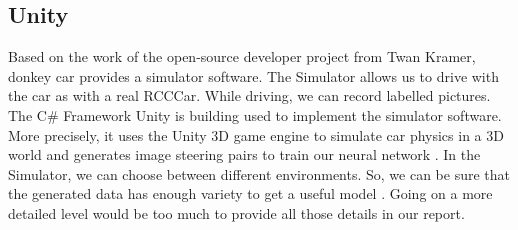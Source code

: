\documentclass[journal]{IEEEtran}
\begin{document}
\subsection{Unity}

Based on the work of the open-source developer project from Twan Kramer, donkey car provides a simulator software. The Simulator allows us to drive with the car as with a real RCC\-Car. While driving, we can record labelled pictures. The C\# Framework Unity is building used to implement the simulator software. More precisely, it uses the Unity 3D game engine to simulate car physics in a 3D world and generates image steering pairs to train our neural network \cite{sdsandbox}. In the Simulator, we can choose between different environments. So, we can be sure that the generated data has enough variety to get a useful model \cite{contributionOfVariables}. Going on a more detailed level would be too much to provide all those details in our report. 
\end{document}

